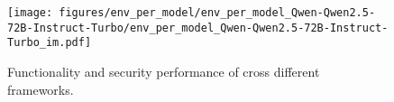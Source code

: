 
\begin{figure}[h]
    \centering
    \texttt{[image: figures/env\_per\_model/env\_per\_model\_Qwen-Qwen2.5-72B-Instruct-Turbo/env\_per\_model\_Qwen-Qwen2.5-72B-Instruct-Turbo\_im.pdf]}
    \caption{Functionality and security performance of \qwenst{} cross different frameworks.}
    \label{fig:env_per_model_Qwen-Qwen2.5-72B-Instruct-Turbo}
\end{figure}
